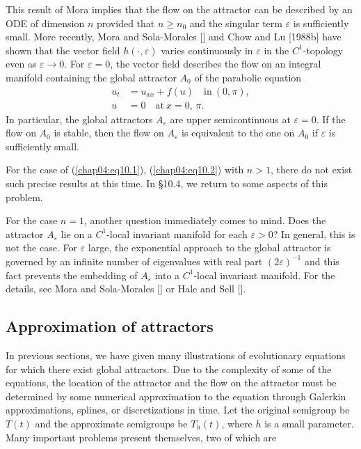 \documentclass{surv-l}
\theoremstyle{plain}
\theoremstyle{definition}
\numberwithin{equation}{section}
\numberwithin{figure}{chapter}
\begin{document}
This result of Mora implies that the flow on the attractor can be described by an ODE of dimension $n$ provided that $n\geq n_{0}$ and the singular term $\varepsilon$ is sufficiently small. More recently, Mora and Sola-Morales [\citeyear{1989ms}] and Chow and Lu [1988b] have shown that the vector field $h(\cdot,\varepsilon)$ varies continuously in $\varepsilon$ in the $C^{1}$-topology even as $\varepsilon \rightarrow 0$. For $\varepsilon =0$, the vector field describes the flow on an integral manifold containing the global attractor $A_{0}$ of the parabolic equation
\begin{align*}
u_{t}&=u_{xx}+f(u)\quad\mathrm{in}\ (0,\pi),\\
u&=0\quad\mathrm{at}\ x=0,\,\pi.
\end{align*}
In particular, the global attractors $A_{\varepsilon}$ are upper semicontinuous at $\varepsilon =0$. If the flow on $A_{0}$ is stable, then the flow on $A_{\varepsilon}$ is equivalent to the one on $A_{0}$ if $\varepsilon$ is sufficiently small.

For the case of (\ref{chap04:eq10.1}), (\ref{chap04:eq10.2}) with $n>1$, there do not exist such precise results at this time. In \S10.4, we return to some aspects of this problem.

For the case $n=1$, another question immediately comes to mind. Does the attractor $A_{\varepsilon}$ lie on a $C^{1}$-local invariant manifold for each $\varepsilon >0$? In general, this is not the case. For $\varepsilon$ large, the exponential approach to the global attractor is governed by an infinite number of eigenvalues with real part $(2\varepsilon)^{-1}$ and this fact prevents the embedding of $A_{\varepsilon}$ into a $C^{1}$-local invariant manifold. For the details, see Mora and Sola-Morales [\citeyear{1987ms}] or Hale and Sell [\citeyear{1988hs}].

\subsection{Approximation of attractors}\label{subsec4.10.3} In previous sections, we have given many illustrations of evolutionary equations for which there exist global attractors. Due to the complexity of some of the equations, the location of the attractor and the flow on the attractor must be determined by some numerical approximation to the equation through Galerkin approximations, splines, or discretizations in time. Let the original semigroup be $T(t)$ and the approximate semigroups be $T_{h}(t)$, where $h$ is a small parameter. Many important problems present themselves, two of which are
\end{document}
